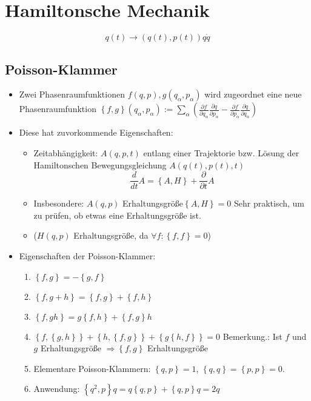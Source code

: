 \section{Hamiltonsche Mechanik}

$$
q(t) \rightarrow (q(t), p(t))
q\dot{q} 
$$

\subsection{Poisson-Klammer}
\begin{itemize}
\item Zwei Phasenraumfunktionen $f(q,p), g(q_\alpha,p_\alpha)$ wird
  zugeordnet eine neue Phasenraumfunktion
  $\left\{ f,g \right\}(q_\alpha,p_\alpha) := \sum\limits_\alpha
  \left( \frac{\partial f}{\partial q_\alpha}\frac{\partial
      q}{\partial p_\alpha} - \frac{\partial f}{\partial
      p_\alpha}\frac{\partial q}{\partial q_\alpha} \right)$

\item Diese hat zuvorkommende Eigenschaften:
\begin{itemize}
\item Zeitabhängigkeit: $A(q,p,t)$ entlang einer Trajektorie
  bzw. Lösung der Hamiltonschen Bewegungsgleichung $A(q(t),p(t),t)$
$$\frac{d}{dt} A = \left\{ A,H \right\} + \frac{\partial}{\partial t}A$$
\item Insbesondere: $A(q,p)$ Erhaltungsgröße$\left\{ A,H \right\}=0$
  Sehr praktisch, um zu prüfen, ob etwas eine Erhaltungsgröße ist.

\item ($H(q,p)$ Erhaltungsgröße, da
  $\forall f:\left\{ f,f \right\}=0$)
\end{itemize}

\item Eigenschaften der Poisson-Klammer:
  \begin{enumerate}
  \item\label{item:1} $\left\{ f,g \right\}=-\left\{ g,f \right\}$
  \item\label{item:2}
    $\left\{ f,g+h \right\}=\left\{ f,g \right\}+\left\{ f,h \right\}$
  \item\label{item:3}
    $\left\{ f,gh \right\}=g\left\{ f,h \right\} + \left\{ f,g
    \right\}h$
  \item\label{item:4}
    $\left\{ f,\left\{ g,h \right\} \right\} + \left\{ h ,\left\{f,g
      \right\} \right\} + \left\{ g\left\{ h,f \right\} \right\} = 0$
    Bemerkung.: Ist $f$ und $g$ Erhaltungsgröße
    $\Rightarrow \left\{ f,g \right\}$ Erhaltungsgröße
  \item\label{item:5} Elementare Poisson-Klammern:
    $\left\{ q,p \right\} = 1$,
    $\left\{ q,q \right\}=\left\{ p,p \right\}=0$.

  \item\label{item:6} Anwendung:
    $\left\{ q^2,p \right\}q = q \left\{ q,p \right\} + \left\{ q,p
    \right\}q = 2q$
  \end{enumerate}

\end{itemize}


